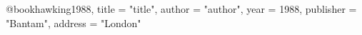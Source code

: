 @book{hawking1988,
  title     = "title",
  author    = "author",
  year      = 1988,
  publisher = "Bantam",
  address   = "London"
}
